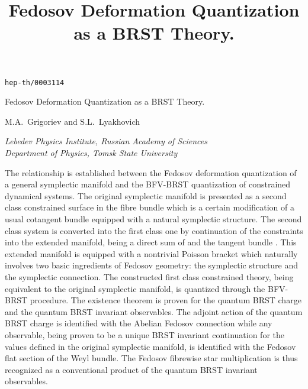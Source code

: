 \documentclass[a4paper,11pt,oneside]{amsart}
\theoremstyle{plain}
\numberwithin{equation}{section} %
\numberwithin{figure}{section} %
\def\mod{{\mathcal T}^*_\rho}
\def\manM{{\mathcal M}}
\begin{document}
\thispagestyle{empty}
\addtolength{\baselineskip}{4pt}
\addtolength{\parskip}{2pt}
\raggedbottom

{\hfill{\lowercase{\tt hep-th/0003114}}\\[12pt]}
\title{Fedosov Deformation Quantization as a BRST Theory.}

\begin{center}
\LARGE{Fedosov Deformation Quantization as a BRST Theory.}
\end{center}

\bigskip

\begin{center}
{\large{M.A.~Grigoriev\coordHE{} and S.L.~Lyakhovich\coordHE{}}}
\end{center}

\begin{center}
\textit{\coordHE{}Lebedev Physics Institute, Russian Academy of Sciences}\\
\textit{\coordHE{}Department of Physics, Tomsk State University}
\end{center}

\vspace{10mm}

\begin{center}
\begin{minipage}{150mm}
\footnotesize{ The relationship is established between the Fedosov
deformation quantization of a general symplectic manifold and the BFV-BRST
quantization of constrained dynamical systems.  The original symplectic
manifold \myHighlight{$\manM$}\coordHE{} is presented as a second class constrained surface in the
fibre bundle \myHighlight{$\mod\manM$}\coordHE{} which is a certain modification of a usual
cotangent bundle equipped with a natural symplectic
structure.  The second class system is converted into the first class one
by continuation of the constraints into the extended manifold, being a
direct sum of \myHighlight{$\mod\manM$}\coordHE{} and the tangent bundle \myHighlight{$T\manM$}\coordHE{}.  This extended
manifold is equipped with a nontrivial Poisson bracket which naturally
involves two basic ingredients of Fedosov geometry:  the symplectic
structure and the symplectic connection.  The constructed first class
constrained theory, being equivalent to the original symplectic manifold,
is quantized through the BFV-BRST procedure.  The existence theorem is
proven for the quantum BRST charge and the quantum BRST invariant
observables.  The adjoint action of the quantum BRST charge is
identified with the Abelian Fedosov connection while any observable,
being proven to be a unique BRST invariant continuation for the values
defined in the original symplectic manifold, is identified with the
Fedosov flat section of the Weyl bundle.  The Fedosov fibrewise star
multiplication is thus recognized as a conventional
product of the quantum BRST invariant observables.}
\end{minipage}
\end{center}
\end{document}
